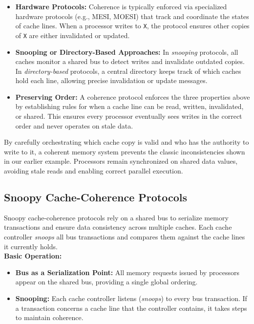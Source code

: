 \begin{itemize}
  \item \textbf{Hardware Protocols:} Coherence is typically enforced via
  specialized hardware protocols (e.g., MESI, MOESI) that track and
  coordinate the states of cache lines. When a processor writes to
  \texttt{X}, the protocol ensures other copies of \texttt{X} are either
  invalidated or updated.

  \item \textbf{Snooping or Directory-Based Approaches:} In
  \emph{snooping} protocols, all caches monitor a shared bus to detect
  writes and invalidate outdated copies. In \emph{directory-based}
  protocols, a central directory keeps track of which caches hold each
  line, allowing precise invalidation or update messages.

  \item \textbf{Preserving Order:} A coherence protocol enforces the
  three properties above by establishing rules for when a cache line
  can be read, written, invalidated, or shared. This ensures every
  processor eventually sees writes in the correct order and never
  operates on stale data.
\end{itemize}

\noindent
By carefully orchestrating which cache copy is valid and who has the
authority to write to it, a coherent memory system prevents the classic
inconsistencies shown in our earlier example. Processors remain
synchronized on shared data values, avoiding stale reads and enabling
correct parallel execution.


\subsection{Snoopy Cache-Coherence Protocols}
Snoopy cache-coherence protocols rely on a shared bus to serialize memory transactions and ensure data consistency across multiple caches. Each cache controller \emph{snoops} all bus transactions and compares them against the cache lines it currently holds. \\

\noindent \textbf{Basic Operation:}
\begin{itemize}
  \item \textbf{Bus as a Serialization Point:} All memory requests issued by processors appear on the shared bus, providing a single global ordering.
  \item \textbf{Snooping:} Each cache controller listens (\emph{snoops}) to every bus transaction. If a transaction concerns a cache line that the controller contains, it takes steps to maintain coherence.
\end{itemize}

